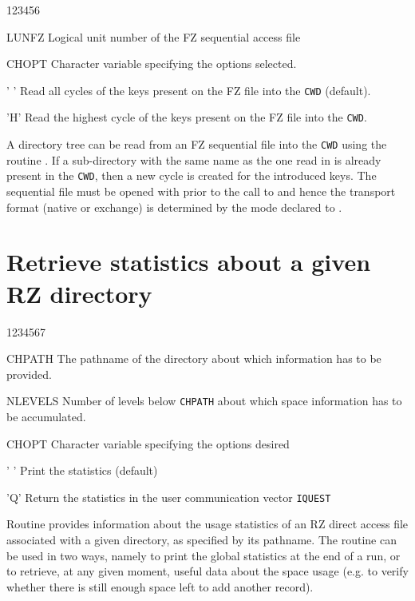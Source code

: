 \begin{DLtt}{123456}
\item[LUNFZ]Logical unit number of the FZ sequential access file
\item[CHOPT]Character variable specifying the options selected.
\begin{DLtt}{12}
\item[' ']Read all cycles of the keys present on the FZ file into the
{\tt CWD} (default).
\item['H']Read the highest cycle of the keys present on the FZ file into
the {\tt CWD}.
\end{DLtt}
\end{DLtt}

A directory tree can be read
from an FZ sequential file
into the {\tt CWD} using the routine .
If a sub-directory with the same name as the one read in is already
present in the {\tt CWD}, then a new cycle is created for the introduced keys.
The sequential file must be opened with 
prior to the call to 
and hence the transport format (native or exchange)
is determined by the mode declared to .

\section{Retrieve statistics about a given RZ directory}


\begin{DLtt}{1234567}
\item[CHPATH]The pathname of the directory about which information
has to be provided.
\item[NLEVELS]Number of levels below {\tt CHPATH} about which space information
has to be accumulated.
\item[CHOPT]Character variable specifying the options desired
\begin{DLtt}{12}
\item[' ']Print the statistics (default)
\item['Q']Return the statistics in the user communication vector {\tt IQUEST}\\
\end{DLtt}
\end{DLtt}

Routine  provides information about the usage statistics
of an RZ direct access file associated with a given directory,
as specified by its pathname.
The routine can be used in two ways,
namely to print the global statistics at the end of a run, or
to retrieve, at any given moment, useful data about the space usage
(e.g. to verify whether there is
still enough space left to add another record).

